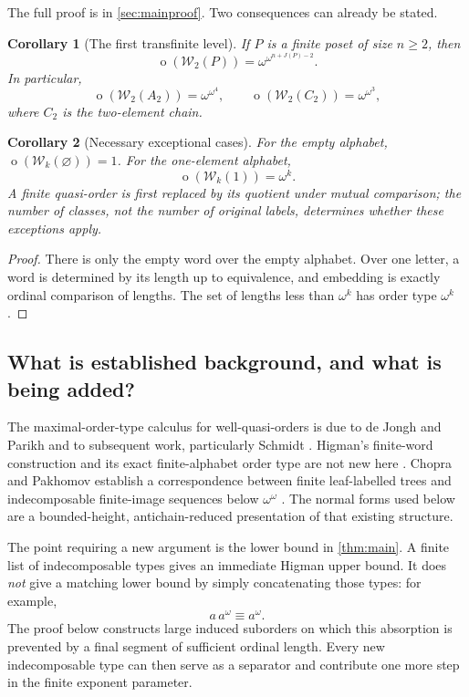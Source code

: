 \documentclass[11pt,letterpaper]{article}
\newtheorem{corollary}[corollary]{Corollary}
\theoremstyle{definition}
\theoremstyle{remark}
\newcommand{\W}{\mathcal W}
\newcommand{\otp}{\operatorname{o}}
\begin{document}
The full proof is in \cref{sec:mainproof}. Two consequences can already be stated.

\begin{corollary}[The first transfinite level]\label{cor:first}
If $P$ is a finite poset of size $n\ge2$, then
\begin{equation}\label{eq:first}
  \otp(\W_2(P))=\omega^{\omega^{n+J(P)-2}}.
\end{equation}
In particular,
\[
  \otp(\W_2(A_2))=\omega^{\omega^4},\qquad
  \otp(\W_2(C_2))=\omega^{\omega^3},
\]
where $C_2$ is the two-element chain.
\end{corollary}

\begin{corollary}[Necessary exceptional cases]\label{cor:exception}
For the empty alphabet, $\otp(\W_k(\varnothing))=1$.
For the one-element alphabet,
\[
  \otp(\W_k(1))=\omega^k.
\]
A finite quasi-order is first replaced by its quotient under mutual comparison;
the number of classes, not the number of original labels, determines whether
these exceptions apply.
\end{corollary}

\begin{proof}
There is only the empty word over the empty alphabet. Over one letter,
a word is determined by its length up to equivalence, and embedding is
exactly ordinal comparison of lengths. The set of lengths less than
$\omega^k$ has order type $\omega^k$.
\end{proof}

\subsection{What is established background, and what is being added?}

The maximal-order-type calculus for well-quasi-orders is due to de Jongh
and Parikh and to subsequent work, particularly Schmidt
\cite{deJonghParikh,Schmidt}. Higman's finite-word construction and its exact
finite-alphabet order type are not new here \cite{Higman,Schmidt}.
Chopra and Pakhomov establish a correspondence between finite leaf-labelled
trees and indecomposable finite-image sequences below $\omega^\omega$
\cite[Theorem~4.26]{ChopraPakhomov}. The normal forms used below are a
bounded-height, antichain-reduced presentation of that existing structure.

The point requiring a new argument is the lower bound in
\cref{thm:main}. A finite list of indecomposable types gives an immediate
Higman upper bound. It does \emph{not} give a matching lower bound by simply
concatenating those types: for example,
\[
  a\,a^\omega\equiv a^\omega.
\]
The proof below constructs large induced suborders on which this absorption
is prevented by a final segment of sufficient ordinal length. Every new
indecomposable type can then serve as a separator and contribute one more
step in the finite exponent parameter.
\end{document}
